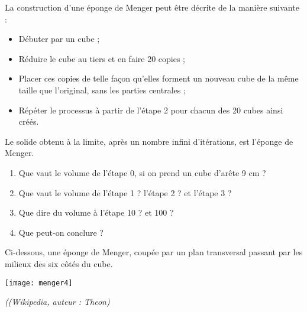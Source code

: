 \begin{TP}
La construction d'une éponge de Menger peut être décrite de la manière suivante :
\begin{itemize}
 \item Débuter par un cube ;
 \item Réduire le cube au tiers et en faire 20 copies ;
 \item Placer ces copies de telle façon qu'elles forment un nouveau cube de la même taille que l'original, sans les parties centrales ;
 \item Répéter le processus à partir de l'étape 2 pour chacun des 20 cubes ainsi créés.
 \end{itemize} 
Le solide obtenu à la limite, après un nombre infini d'itérations, est l'éponge de Menger.
\begin{enumerate}
 \item Que vaut le volume de l'étape 0, si on prend un cube d'arête 9 cm ?
 \item Que vaut le volume de l'étape 1 ? l'étape 2 ? et l'étape 3 ?
 \item Que dire du volume à l'étape 10 ? et 100 ?
 \item Que peut-on conclure ?
 \end{enumerate}
Ci-dessous, une éponge de Menger, coupée par un plan transversal passant par les milieux des six côtés du cube.
 \begin{center} \texttt{[image: menger4]} \end{center}
 \qquad \qquad \qquad \qquad \qquad \qquad \qquad \qquad \qquad \qquad \small{\emph{((Wikipedia, auteur : Theon)}}
 
\end{TP}

